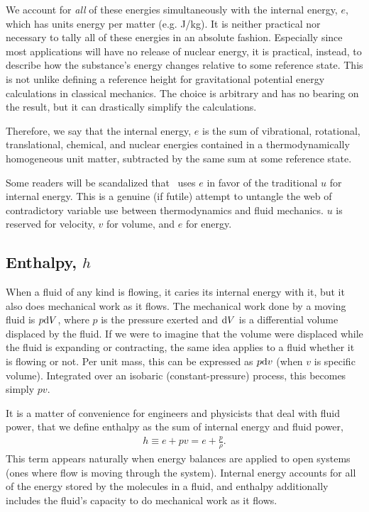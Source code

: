 We account for \emph{all} of these energies simultaneously with the internal energy, $e$, which has units energy per matter (e.g. J/kg).  It is neither practical nor necessary to tally all of these energies in an absolute fashion.  Especially since most applications will have no release of nuclear energy, it is practical, instead, to describe how the substance's energy changes relative to some reference state.  This is not unlike defining a reference height for gravitational potential energy calculations in classical mechanics.  The choice is arbitrary and has no bearing on the result, but it can drastically simplify the calculations.

Therefore, we say that the internal energy, $e$ is the sum of vibrational, rotational, translational, chemical, and nuclear energies contained in a thermodynamically homogeneous unit matter, subtracted by the same sum at some reference state.

Some readers will be scandalized that \PM\ uses $e$ in favor of the traditional $u$ for internal energy.  This is a genuine (if futile) attempt to untangle the web of contradictory variable use between thermodynamics and fluid mechanics.  $u$ is reserved for velocity, $v$ for volume, and $e$ for energy.

\subsection{Enthalpy, $h$}\label{sec:intro:h}

When a fluid of any kind is flowing, it caries its internal energy with it, but it also does mechanical work as it flows.  The mechanical work done by a moving fluid is $p \mathrm{d} V$, where $p$ is the pressure exerted and $\mathrm{d} V$ is a differential volume displaced by the fluid.  If we were to imagine that the volume were displaced while the fluid is expanding or contracting, the same idea applies to a fluid whether it is flowing or not.  Per unit mass, this can be expressed as $p \mathrm{d} v$ (when $v$ is specific volume).  Integrated over an isobaric (constant-pressure) process, this becomes simply $p v$.

It is a matter of convenience for engineers and physicists that deal with fluid power, that we define enthalpy as the sum of internal energy and fluid power,
\begin{align}
h \equiv e + pv = e + \frac{p}{\rho}.\label{eqn:intro:h}
\end{align}
This term appears naturally when energy balances are applied to open systems (ones where flow is moving through the system).  Internal energy accounts for all of the energy stored by the molecules in a fluid, and enthalpy additionally includes the fluid's capacity to do mechanical work as it flows.

